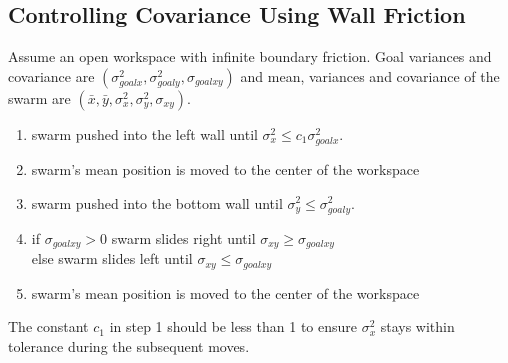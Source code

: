 \subsection{Controlling Covariance Using Wall Friction}\label{subsec:ClosedLoopCovarianceControl}
Assume an open workspace with infinite boundary friction. Goal variances and covariance are  $(\sigma_{goalx}^2,\sigma_{goaly}^2, \sigma_{goalxy})$ and mean, variances and covariance of the swarm  are $( \bar{x},\bar{y},\sigma_x^2,\sigma_y^2, \sigma_{xy})$. 
\begin{enumerate}
\item swarm pushed into the left wall until $\sigma_x^2 \le c_1\sigma_{goalx}^2$.  
\item swarm's mean position is moved to the center of the workspace
\item swarm pushed into the bottom wall until $\sigma_y^2 \le  \sigma_{goaly}^2$. 
\item if $\sigma_{goalxy}>0$ swarm slides right until $\sigma_{xy} \ge \sigma_{goalxy}$ \\
else swarm slides left until $\sigma_{xy} \le \sigma_{goalxy}$ 
\item  swarm's mean position is moved to the center of the workspace
\end{enumerate}
The constant $c_1$ in step 1 should be less than 1 to ensure $\sigma_x^2$ stays within tolerance during the subsequent moves.


